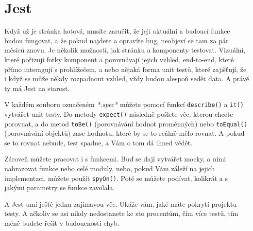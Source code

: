\section{Jest}

Když už je stránka hotová, musíte zaručit, že její aktuální a budoucí funkce budou fungovat, a že pokud najdete a opravíte bug, neobjeví se tam za pár měsíců znovu. Je několik možností, jak stránku a komponenty testovat\cite{TypesOfTests}. Vizuální, které pořizují fotky komponent a porovnávají jejich vzhled, end-to-end, které přímo interagují s prohlížečem, a nebo nějaká forma unit testů, které zajišťují, že i když se může někdy rozpadnout vzhled, vždy budou alespoň sedět data. A právě ty má Jest na starost.

V každém souboru označeném \textit{*.spec*} můžete pomocí funkcí \texttt{describe()} a \texttt{it()} vytvářet unit testy. Do metody \texttt{expect()} následně pošlete věc, kterou chcete porovnat, a do metod \texttt{toBe()} (porovnávání hodnot proměnných) nebo \texttt{toEqual()} (porovnávání objektů) zase hodnotu, které by se to reálně mělo rovnat. A pokud se to rovnat nebude, test spadne, a Vám o tom dá ihned vědět.

Zároveň můžete pracovat i s funkcemi\cite{JestMethods}. Buď se dají vytvářet mocky, a nimi nahrazovat funkce nebo celé moduly, nebo, pokud Vám záleží na jejich implementaci, můžete použít \texttt{spyOn()}. Poté se můžete podívat, kolikrát a s jakými parametry se funkce zavolala.

A Jest umí ještě jednu zajímavou věc. Ukáže vám, jaké máte pokrytí projektu testy\cite{JestCoverage}. A ačkoliv se asi nikdy nedostanete ke sto procentům, čím více testů, tím méně budete řešit v budoucnosti chyb.